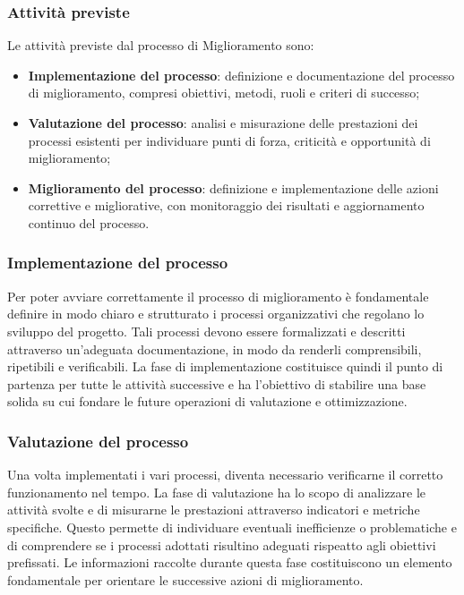 \documentclass[a4paper,12pt]{article}
\begin{document}
        \subsubsection{Attività previste}
            Le attività previste dal processo di Miglioramento sono:
            \begin{itemize}
                \item \textbf{Implementazione del processo}: definizione e documentazione del processo di miglioramento, compresi obiettivi, metodi, ruoli e criteri di successo;
                \item \textbf{Valutazione del processo}: analisi e misurazione delle prestazioni dei processi esistenti per individuare punti di forza, criticità e opportunità di miglioramento;
                \item \textbf{Miglioramento del processo}: definizione e implementazione delle azioni correttive e migliorative, con monitoraggio dei risultati e aggiornamento continuo del processo.
            \end{itemize}

        \subsubsection{Implementazione del processo}
            Per poter avviare correttamente il processo di miglioramento è fondamentale definire in modo chiaro e strutturato i processi organizzativi che regolano lo sviluppo del progetto.
            Tali processi devono essere formalizzati e descritti attraverso un'adeguata documentazione, in modo da renderli comprensibili, ripetibili e verificabili.
            La fase di implementazione costituisce quindi il punto di partenza per tutte le attività successive e ha l'obiettivo di stabilire una base solida su cui fondare le future operazioni di valutazione e ottimizzazione.

        \subsubsection{Valutazione del processo}
            Una volta implementati i vari processi, diventa necessario verificarne il corretto funzionamento nel tempo.
            La fase di valutazione ha lo scopo di analizzare le attività svolte e di misurarne le prestazioni attraverso indicatori e metriche specifiche.
            Questo permette di individuare eventuali inefficienze o problematiche e di comprendere se i processi adottati risultino adeguati rispeatto agli obiettivi prefissati.
            Le informazioni raccolte durante questa fase costituiscono un elemento fondamentale per orientare le successive azioni di miglioramento.
        
\end{document}
